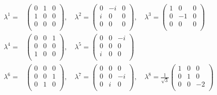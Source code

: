 \documentclass[12pt,a4paper,epsf,portrait,times,epsfig]{report}
\begin{document}
	\begin{equation}
		\begin{split}
			\lambda^{1}=&\begin{pmatrix}
				0 & 1 & 0 \\
				1 & 0 & 0 \\
				0 & 0 & 0 \\
			\end{pmatrix},\quad
			\lambda^{2}=\begin{pmatrix}
				0 & -i & 0 \\
				i & 0 & 0 \\
				0 & 0 & 0 \\
			\end{pmatrix},\quad
			\lambda^{3}=\begin{pmatrix}
				1 & 0 & 0 \\
				0 & -1 & 0 \\
				0 & 0 & 0 \\
			\end{pmatrix} \\
			\lambda^{4}=&\begin{pmatrix}
				0 & 0 & 1 \\
				0 & 0 & 0 \\
				1 & 0 & 0 \\
			\end{pmatrix},\quad
			\lambda^{5}=\begin{pmatrix}
				0 & 0 & -i \\
				0 & 0 & 0 \\
				i & 0 & 0 \\
			\end{pmatrix} \\
			\lambda^{6}=&\begin{pmatrix}
				0 & 0 & 0 \\
				0 & 0 & 1 \\
				0 & 1 & 0 \\
			\end{pmatrix},\quad
			\lambda^{7}=\begin{pmatrix}
				0 & 0 & 0 \\
				0 & 0 & -i \\
				0 & i & 0 \\
			\end{pmatrix},\quad
			\lambda^{8}=\frac{1}{\sqrt{3}}\begin{pmatrix}
				1 & 0 & 0 \\
				0 & 1 & 0 \\
				0 & 0 & -2 \\
			\end{pmatrix} \\
		\end{split}
	\end{equation}
\end{document}
